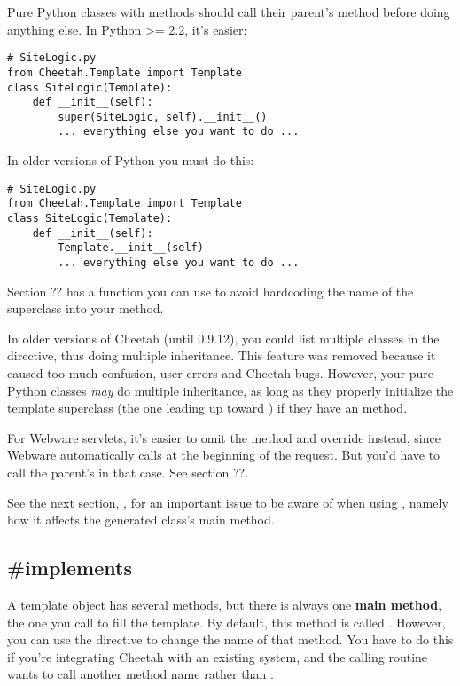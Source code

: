 Pure Python classes with  methods should call their
parent's  method before doing anything else.  In Python
>= 2.2, it's easier:
\begin{verbatim}
# SiteLogic.py
from Cheetah.Template import Template
class SiteLogic(Template):
	def __init__(self):
		super(SiteLogic, self).__init__()
		... everything else you want to do ...
\end{verbatim}

In older versions of Python you must do this:
\begin{verbatim}
# SiteLogic.py
from Cheetah.Template import Template
class SiteLogic(Template):
	def __init__(self):
		Template.__init__(self)
		... everything else you want to do ...
\end{verbatim}

Section ?? has a function you can use to avoid hardcoding the name of the
superclass into your  method.

In older versions of Cheetah (until 0.9.12), you could list multiple classes
in the  directive, thus doing multiple inheritance.  This 
feature was removed because it caused too much confusion, user errors and
Cheetah bugs.  However, your pure Python classes {\em may} do multiple
inheritance, as long as they properly initialize the template superclass 
(the one leading up toward ) if they have an
 method.

For Webware servlets, it's easier to omit the  method
and override  instead, since Webware automatically calls
 at the beginning of the request.  But you'd have to call
the parent's  in that case.  See section ??.

See the next section, , for an important issue to be aware
of when using , namely how it affects the generated class's
main method.


\subsection{\#implements}
\label{inheritanceEtc.implements}


A template object has several methods, but there is always one {\bf main
method}, the one you call to fill the template.  By default, this method is
called .  However, you can use the 
directive to change the name of that method.  You have to do this if you're
integrating Cheetah with an existing system, and the calling routine wants to
call another method name rather than .

